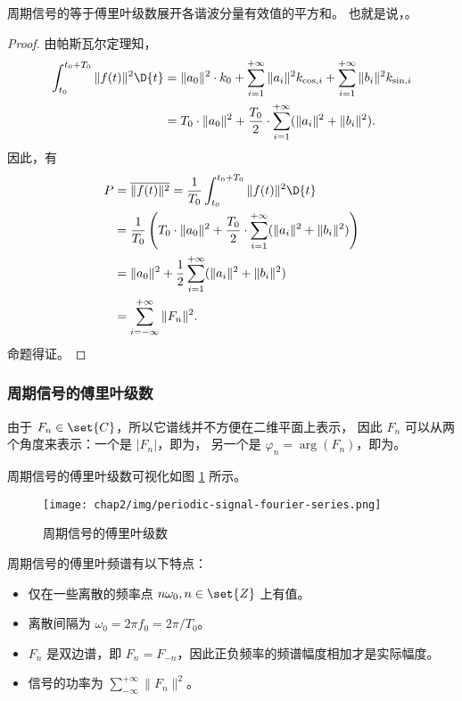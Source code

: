 \begin{corollary}[帕斯瓦尔定理的推论]
    周期信号的等于傅里叶级数展开各谐波分量有效值的平方和。
    也就是说，。
\end{corollary}

\begin{proof}
    由帕斯瓦尔定理知，
    \begin{align*}
        \int_{t_0}^{t_0 + T_0}\|f(t)\|^2\D{t} & = \|a_0\|^2\cdot k_0
            + \sum_{i = 1}^{+\infty}\|a_i\|^2k_{\cos, i}
            + \sum_{i = 1}^{+\infty}\|b_i\|^2k_{\sin, i} \\
        & = T_0 \cdot \|a_0\|^2 + \frac{T_0}{2}\cdot \sum_{i = 1}^{+\infty}(\|a_i\|^2 + \|b_i\|^2).
    \end{align*}
    因此，有
    \begin{align*}
        P & = \overline{\|f(t)\|^2} = \frac{1}{T_0}\int_{t_0}^{t_0 + T_0}\|f(t)\|^2\D{t} \\
        & = \frac{1}{T_0}\left(T_0 \cdot \|a_0\|^2 + \frac{T_0}{2}\cdot \sum_{i = 1}^{+\infty}(\|a_i\|^2 + \|b_i\|^2)\right) \\
        & = \|a_0\|^2 + \frac{1}{2}\sum_{i = 1}^{+\infty}(\|a_i\|^2 + \|b_i\|^2) \\
        & = \sum_{i = -\infty}^{+\infty}\|F_n\|^2.
    \end{align*}
    命题得证。
\end{proof}

\subsubsection{周期信号的傅里叶级数}

\begin{definition}[周期信号的傅里叶级数]
    由于 $F_n \in \set{C}$，所以它谱线并不方便在二维平面上表示，
    因此 $F_n$ 可以从两个角度来表示：一个是 $|F_n|$，即为，
    另一个是 $\varphi_n = \arg(F_n)$，即为。

    周期信号的傅里叶级数可视化如图 \ref{fig:periodic-signal-fourier-series} 所示。
    \begin{figure}[H]
        \centering
        \texttt{[image: chap2/img/periodic-signal-fourier-series.png]}
        \caption{周期信号的傅里叶级数}
        \label{fig:periodic-signal-fourier-series}
    \end{figure}
\end{definition}

\begin{property}[周期信号的傅里叶频谱特点]
    周期信号的傅里叶频谱有以下特点：
    \begin{itemize}
        \item 仅在一些离散的频率点 $n\omega_0, n \in \set{Z}$ 上有值。
        \item 离散间隔为 $\omega_0 = 2\pi f_0 = 2\pi / T_0$。
        \item $F_n$ 是双边谱，即 $F_n = F_{-n}$，因此正负频率的频谱幅度相加才是实际幅度。
        \item 信号的功率为 $\sum_{-\infty}^{+\infty}\|F_n\|^2$。
    \end{itemize}
\end{property}

